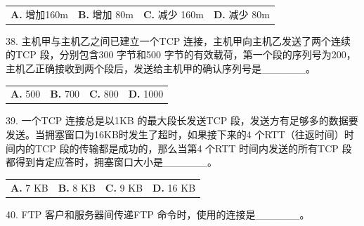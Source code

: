 \documentclass[UTF8,11pt]{ctexart}
\begin{document}
\begin{center}\begin{tabular}{>{\raggedright\arraybackslash}p{\dimexpr(\linewidth-8\tabcolsep)/4\relax}>{\raggedright\arraybackslash}p{\dimexpr(\linewidth-8\tabcolsep)/4\relax}>{\raggedright\arraybackslash}p{\dimexpr(\linewidth-8\tabcolsep)/4\relax}>{\raggedright\arraybackslash}p{\dimexpr(\linewidth-8\tabcolsep)/4\relax}}
\textbf{A.} 增加160m & \textbf{B.} 增加 80m & \textbf{C.} 减少 160m & \textbf{D.} 减少 80m\\[.35em]\end{tabular}\end{center}

38. 主机甲与主机乙之间已建立一个TCP 连接，主机甲向主机乙发送了两个连续的TCP 段，分别包含300 字节和500 字节的有效载荷，第一个段的序列号为200，主机乙正确接收到两个段后，发送给主机甲的确认序列号是\_\_\_\_\_\_。


\begin{center}\begin{tabular}{>{\raggedright\arraybackslash}p{\dimexpr(\linewidth-8\tabcolsep)/4\relax}>{\raggedright\arraybackslash}p{\dimexpr(\linewidth-8\tabcolsep)/4\relax}>{\raggedright\arraybackslash}p{\dimexpr(\linewidth-8\tabcolsep)/4\relax}>{\raggedright\arraybackslash}p{\dimexpr(\linewidth-8\tabcolsep)/4\relax}}
\textbf{A.} 500 & \textbf{B.} 700 & \textbf{C.} 800 & \textbf{D.} 1000\\[.35em]\end{tabular}\end{center}

39. 一个TCP 连接总是以1KB 的最大段长发送TCP 段，发送方有足够多的数据要发送。当拥塞窗口为16KB时发生了超时，如果接下来的4 个RTT（往返时间）时间内的TCP 段的传输都是成功的，那么当第4 个RTT 时间内发送的所有TCP 段都得到肯定应答时，拥塞窗口大小是\_\_\_\_\_\_。


\begin{center}\begin{tabular}{>{\raggedright\arraybackslash}p{\dimexpr(\linewidth-8\tabcolsep)/4\relax}>{\raggedright\arraybackslash}p{\dimexpr(\linewidth-8\tabcolsep)/4\relax}>{\raggedright\arraybackslash}p{\dimexpr(\linewidth-8\tabcolsep)/4\relax}>{\raggedright\arraybackslash}p{\dimexpr(\linewidth-8\tabcolsep)/4\relax}}
\textbf{A.} 7 KB & \textbf{B.} 8 KB & \textbf{C.} 9 KB & \textbf{D.} 16 KB\\[.35em]\end{tabular}\end{center}

40. FTP 客户和服务器间传递FTP 命令时，使用的连接是\_\_\_\_\_\_。
\end{document}
